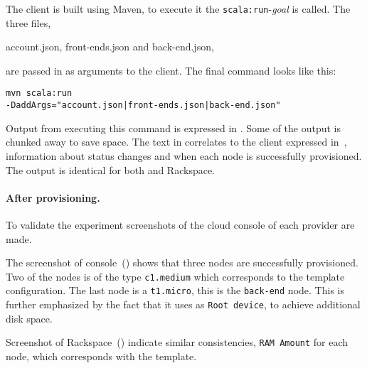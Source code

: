 The client is built using Maven, to execute it the \texttt{scala:run}-\emph{goal} is called.
The three files,
\begin{ii}
  \iitem account.json,
  \iitem front-ends.json and
  \iitem back-end.json,
\end{ii}
are passed in as arguments to the client.
The final command looks like this:
\begin{verbatim}
mvn scala:run 
-DaddArgs="account.json|front-ends.json|back-end.json"
\end{verbatim}
Output from executing this command is expressed in .
Some of the output is chunked away to save space.
The text in  correlates to the 
client expressed in~,
\ie information about status changes and when each node is successfully provisioned.
The output is identical for both  and Rackspace.

\paragraph{After provisioning.}


To validate the experiment screenshots of the cloud console of each provider are made.

The screenshot of  console~() shows that three nodes
are successfully provisioned.
Two of the nodes is of the type \texttt{c1.medium} which corresponds to the template configuration.
The last node is a \texttt{t1.micro}, \ie this is the \texttt{back-end} node.
This is further emphasized by the fact that it uses  as \texttt{Root device},
to achieve additional disk space.

Screenshot of Rackspace~() indicate similar consistencies,
\eg \texttt{RAM Amount} for each node, which corresponds with the template.
